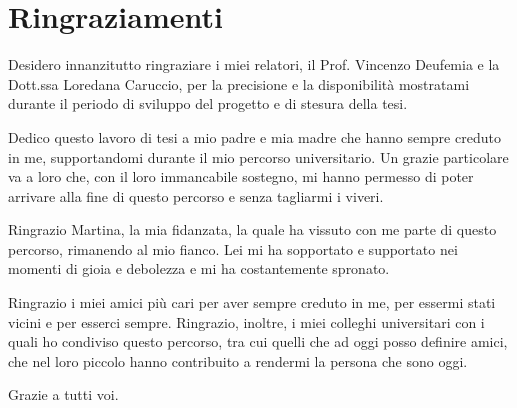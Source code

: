 \chapter{Ringraziamenti}
Desidero innanzitutto ringraziare i miei relatori, il Prof. Vincenzo Deufemia e la Dott.ssa Loredana Caruccio, per la precisione e la disponibilit\`{a} mostratami durante il periodo di sviluppo del progetto e di stesura della tesi.\par
\vspace{5mm}
Dedico questo lavoro di tesi a mio padre e mia madre che hanno sempre creduto in me, supportandomi durante il mio percorso universitario. Un grazie particolare va a loro che, con il loro immancabile sostegno, mi hanno permesso di poter arrivare alla fine di questo percorso e senza tagliarmi i viveri.\par
\vspace{5mm}
Ringrazio Martina, la mia fidanzata, la quale ha vissuto con me parte di questo percorso, rimanendo al mio fianco. Lei mi ha sopportato e supportato nei momenti di gioia e debolezza e mi ha costantemente spronato.\par
\vspace{5mm}
Ringrazio i miei amici pi\`{u} cari per aver sempre creduto in me, per essermi stati vicini e per esserci sempre. Ringrazio, inoltre, i miei colleghi universitari con i quali ho condiviso questo percorso, tra cui quelli che ad oggi posso definire amici, che nel loro piccolo hanno contribuito a rendermi la persona che sono oggi.\par

\vfill
Grazie a tutti voi.